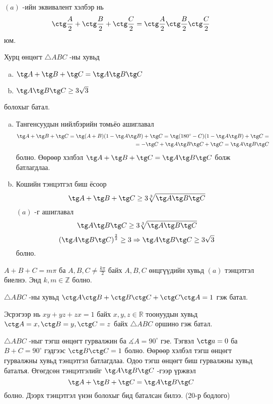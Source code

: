 \documentclass[10pt,a4paper,oneside]{book}
\begin{document}
\Note
$(a)$ -ийн эквивалент хэлбэр нь 
\begin{equation*}
\ctg\frac{A}{2}+\ctg\frac{B}{2} + \ctg\frac{C}{2} = \ctg\frac{A}{2}\ctg\frac{B}{2}\ctg\frac{C}{2}
\end{equation*}
юм.

\Problem
Хурц өнцөгт $\triangle ABC$ -ны хувьд
\begin{enumerate}[(a)]
\item
$\tg A + \tg B + \tg C = \tg A\tg B \tg C$
\item
$\tg A \tg B\tg C \geq 3\sqrt{3}$
\end{enumerate}
болохыг батал.

\TheSolution
\begin{enumerate}[(a)]
\item
Тангенсуудын нийлбэрийн томьёо ашиглавал
\begin{align*}
\tg A +\tg B + \tg C = \tg (A+B)(1-\tg A \tg B) + \tg C = \tg(180^\circ - C)(1-\tg A \tg B) + \tg C =\\
= -\tg C + \tg A\tg B\tg C + \tg C = \tg A\tg B\tg C
\end{align*}
болно.
Өөрөөр хэлбэл 
$\tg A + \tg B + \tg C = \tg A\tg B \tg C$
болж батлагдлаа.
\item
Кошийн тэнцэтгэл биш ёсоор
\begin{equation*}
\tg A + \tg B + \tg C \geq 3\sqrt[3]{\tg A \tg B \tg C}
\end{equation*}
$(a)$ -г ашиглавал
\begin{equation*}
\tg A\tg B\tg C \geq 3\sqrt[3]{\tg A \tg B \tg C}
\end{equation*}
\begin{equation*}
\left(\tg A \tg B \tg C\right)^{\frac{2}{3}} \geq 3 \Rightarrow \tg A \tg B \tg C \geq 3\sqrt{3}
\end{equation*}
болно.
\end{enumerate}

\Note
$A+B+C = m\pi$ ба $A, B, C \neq \frac{k\pi}{2}$ байх $A, B, C$ өнцгүүдийн хувьд $(a)$ тэнцэтгэл биелнэ. Энд $k, m \in \mathbb{Z}$ болно.

\Problem
$\triangle ABC$ -ны хувьд $\ctg A\ctg B + \ctg B\ctg C + \ctg C\ctg A = 1$ гэж батал.

Эсрэгээр нь $xy+yz+zx = 1$ байх $x,y,z \in \mathbb{R}$ тоонуудын хувьд $\ctg A = x, \ctg B = y, \ctg C = z$ байх $\triangle ABC$ оршино гэж батал.

\TheSolution
$\triangle ABC$ -ныг тэгш өнцөгт гурвалжин ба $\measuredangle A = 90^\circ$ гэе. Тэгвэл $\ctg a = 0$ ба $B+C = 90^\circ$ гэдгээс $\ctg B \ctg C = 1$ болно. Өөрөөр хэлбэл тэгш өнцөгт гурвалжны хувьд тэнцэтгэл батлагдлаа. Одоо тэгш өнцөгт биш гурвалжны хувьд баталъя. Өгөгдсөн тэнцэтгэлийг $\tg A\tg B\tg C$ -гээр үржвэл
\begin{equation*}
\tg A + \tg B + \tg C = \tg A\tg B\tg C
\end{equation*}
болно. Дээрх тэнцэтгэл үнэн болохыг бид баталсан билээ. (20-р бодлого)
\end{document}
